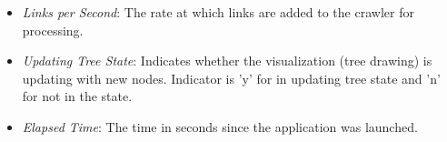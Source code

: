 \documentclass[10pt,psfig]{article}
\begin{document}
{{\begin{itemize}
\item {\em Links per Second}: The rate at which links are added to the crawler for processing.

\item {\em Updating Tree State}: Indicates whether the visualization (tree drawing) is updating with new nodes.  Indicator is 'y' for in updating tree state and 'n' for not in the state.
 
\item {\em Elapsed Time}: The time in seconds since the application was launched.

\end{itemize}
}

}
\end{document}
